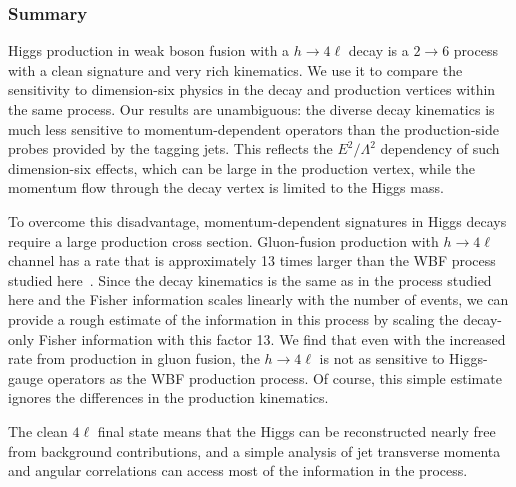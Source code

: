 \subsubsection*{Summary}

Higgs production in weak boson fusion with a $h \to 4 \ell$ decay is a
$2 \to 6$ process with a clean signature and very rich kinematics. We
use it to compare the sensitivity to dimension-six physics in the
decay and production vertices within the same process. Our results are
unambiguous: the diverse decay kinematics is much less sensitive to
momentum-dependent operators than the production-side probes provided
by the tagging jets. This reflects the $E^2/\Lambda^2$ dependency of
such dimension-six effects, which can be large in the production
vertex, while the momentum flow through the decay vertex is limited to
the Higgs mass.

To overcome this disadvantage, momentum-dependent signatures in Higgs
decays require a large production cross section. Gluon-fusion
production with $h \to 4\ell$ channel has a rate that is approximately
13 times larger than the WBF process studied
here~\cite{deFlorian:2016spz}. Since the decay kinematics is the same
as in the process studied here and the Fisher information scales
linearly with the number of events, we can provide a rough estimate of
the information in this process by scaling the decay-only Fisher
information with this factor 13. We find that even with the increased
rate from production in gluon fusion, the $h \to 4 \ell$ is not as
sensitive to Higgs-gauge operators as the WBF production process. Of
course, this simple estimate ignores the differences in the production
kinematics.

The clean $4\ell$ final state means that the Higgs can be
reconstructed nearly free from background contributions, and a simple
analysis of jet transverse momenta and angular correlations can access
most of the information in the process.




